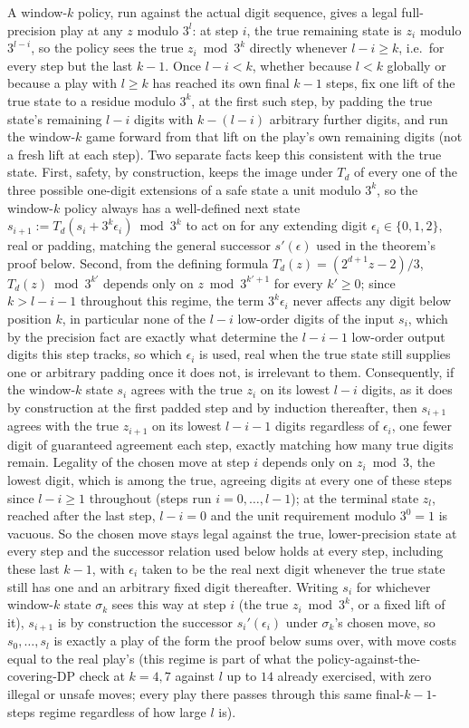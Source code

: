 \documentclass[11pt]{amsart}
\theoremstyle{plain}
\theoremstyle{definition}
\theoremstyle{remark}
\begin{document}
A window-$k$ policy, run against the actual digit sequence, gives a legal full-precision play at any
$z$ modulo $3^l$: at step $i$, the true remaining state is $z_i$ modulo $3^{l-i}$, so the policy
sees the true $z_i\bmod3^k$ directly whenever $l-i\ge k$, i.e.\ for every step but the last $k-1$.
Once $l-i<k$, whether because $l<k$ globally or because a play with $l\ge k$ has reached its own
final $k-1$ steps, fix one lift of the true state to a residue modulo $3^k$, at the first such step,
by padding the true state's remaining $l-i$ digits with $k-(l-i)$ arbitrary further digits, and run
the window-$k$ game forward from that lift on the play's own remaining digits (not a fresh lift at
each step). Two separate facts keep this consistent with the true state. First, safety, by
construction, keeps the image under $T_d$ of every one of the three possible one-digit extensions
of a safe state a unit modulo $3^k$, so the window-$k$ policy always has a well-defined next state
$s_{i+1}:=T_d(s_i+3^k\epsilon_i)\bmod3^k$ to act on for any extending digit $\epsilon_i\in\{0,1,2\}$,
real or padding, matching the general successor $s'(\epsilon)$ used in the theorem's proof below.
Second, from the defining formula $T_d(z)=(2^{d+1}z-2)/3$, $T_d(z)\bmod3^{k'}$ depends only on
$z\bmod3^{k'+1}$ for every $k'\ge0$; since $k>l-i-1$ throughout this regime, the term $3^k\epsilon_i$
never affects any digit below position $k$, in particular none of the $l-i$ low-order digits of the
input $s_i$, which by the precision fact are exactly what determine the $l-i-1$ low-order output
digits this step tracks, so which $\epsilon_i$ is used, real when the true state still supplies one or
arbitrary padding once it does not, is irrelevant to them. Consequently, if the window-$k$ state $s_i$ agrees
with the true $z_i$ on its lowest $l-i$ digits, as it does by construction at the first padded step
and by induction thereafter, then $s_{i+1}$ agrees with the true $z_{i+1}$ on its lowest $l-i-1$
digits regardless of $\epsilon_i$, one fewer digit of guaranteed agreement each step, exactly matching
how many true digits remain. Legality of the chosen
move at step $i$ depends only on $z_i\bmod3$, the lowest digit, which is among the true, agreeing
digits at every one of these steps since $l-i\ge1$ throughout (steps run $i=0,\dots,l-1$); at the
terminal state $z_l$, reached after the last step, $l-i=0$ and the unit
requirement modulo $3^0=1$ is vacuous. So the chosen move stays legal against the true,
lower-precision state at every step and the successor relation used below holds at every step,
including these last $k-1$, with $\epsilon_i$ taken to be the real next digit whenever the true state
still has one and an arbitrary fixed digit thereafter. Writing $s_i$ for whichever window-$k$ state
$\sigma_k$ sees this way at step
$i$ (the true $z_i\bmod3^k$, or a fixed lift of it), $s_{i+1}$ is by construction the successor
$s_i'(\epsilon_i)$ under $\sigma_k$'s chosen move,
so $s_0,\dots,s_l$ is exactly a play of the form the proof below sums over,
with move costs equal to the real play's (this regime is part of what the policy-against-the-covering-DP check at
$k=4,7$ against $l$ up to $14$ already exercised, with zero illegal or unsafe moves; every play
there passes through this same final-$k-1$-steps regime regardless of how large $l$ is).
\end{document}
